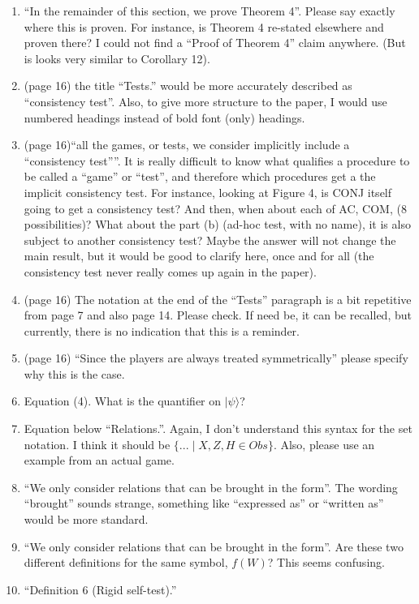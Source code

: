 \documentclass[12pt]{article}
\begin{document}
\begin{enumerate}
\item ``In the remainder of this section, we prove Theorem 4''. Please say exactly where this is proven. For instance, is Theorem 4 re-stated elsewhere and proven there? I could not find a ``Proof of Theorem 4'' claim anywhere. (But is looks very similar to Corollary 12).
    \item (page 16) the title ``Tests.'' would be more accurately described as ``consistency test''. Also, to give more structure to the paper, I would use numbered headings instead of bold font (only) headings.
        \item (page 16)``all the games, or tests, we
consider implicitly include a “consistency test”''. It is really difficult to know what qualifies a procedure to be called a ``game'' or ``test'', and therefore which procedures get a the implicit consistency test. For instance, looking at Figure 4, is CONJ itself going to get a consistency test? And then, when about each of AC, COM, (8 possibilities)? What about the part (b) (ad-hoc test, with no name), it is also subject to another consistency test? Maybe the answer will not change the main result, but it would be good to clarify here, once and for all (the consistency test never really comes up again in the paper).
 \item (page 16) The notation at the end of the ``Tests'' paragraph is a bit repetitive from page 7 and also page 14. Please check. If need be, it can be recalled, but currently, there is no indication that this is a reminder.
 \item (page 16) ``Since the players are always treated symmetrically'' please specify why this is the case.
 \item Equation (4). What is the quantifier on $|\psi\rangle$?
 \item Equation below ``Relations.''. Again, I don't understand this syntax for the set notation. I think it should be $\{... \mid X, Z, H \in Obs\}$. Also, please use an example from an actual game.
 \item ``We only consider relations that can be brought in the form''. The wording ``brought'' sounds strange, something like ``expressed as'' or ``written as'' would be more standard.
     \item ``We only consider relations that can be brought in the form''. Are these two different definitions for the same symbol, $f(W)$? This seems confusing.
\item  ``Definition 6 (Rigid self-test).''
\begin{enumerate}

\end{enumerate}
\end{enumerate}
\end{document}
